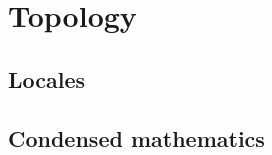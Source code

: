 \chapter{Topology}
    \begin{abstract}
        
    \end{abstract}
    
    \minitoc
    
    \section{Locales}
    
    \section{Condensed mathematics} \label{section: condensed_mathematics}
